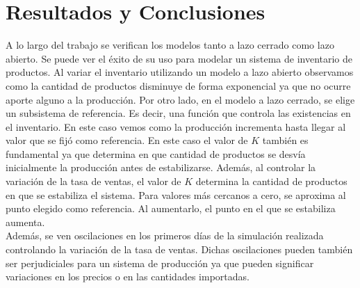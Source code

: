 \documentclass{sig-alternate}
\begin{document}
\section{Resultados y Conclusiones}
\label{results_and_conclusions_section}
A lo largo del trabajo se verifican los modelos tanto a lazo cerrado como lazo abierto. Se puede ver el éxito de su uso para modelar un sistema
de inventario de productos. Al variar el inventario utilizando un modelo a lazo abierto observamos como la cantidad de productos disminuye de
forma exponencial ya que no ocurre aporte alguno a la producción.  Por otro lado, en el modelo a lazo cerrado, se elige un subsistema de referencia.
Es decir, una función que controla las existencias en el inventario. En este caso vemos como la producción incrementa hasta llegar al valor 
que se fijó como referencia. En este caso el valor de $K$ también es fundamental ya que determina
en que cantidad de productos se desvía inicialmente la producción antes de estabilizarse. Además, al controlar la variación de la tasa de ventas,
el valor de $K$ determina la cantidad de productos en que se estabiliza el sistema. Para valores más cercanos a cero, se aproxima al punto
elegido como referencia. Al aumentarlo, el punto en el que se estabiliza aumenta.\\
Además, se ven oscilaciones en los primeros días de la simulación realizada controlando la variación de la tasa de ventas. Dichas oscilaciones
pueden también ser perjudiciales para un sistema de producción ya que pueden significar variaciones en los precios o en las cantidades importadas.


\nocite{*}

\end{document}
